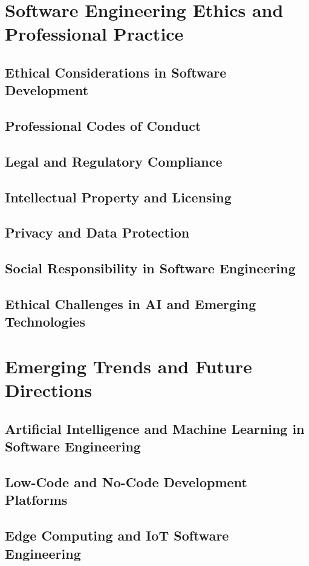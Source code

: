 \newpage

\section{Software Engineering Ethics and Professional Practice}
\subsection{Ethical Considerations in Software Development}
\subsection{Professional Codes of Conduct}
\subsection{Legal and Regulatory Compliance}
\subsection{Intellectual Property and Licensing}
\subsection{Privacy and Data Protection}
\subsection{Social Responsibility in Software Engineering}
\subsection{Ethical Challenges in AI and Emerging Technologies}

\newpage

\section{Emerging Trends and Future Directions}
\subsection{Artificial Intelligence and Machine Learning in Software Engineering}
\subsection{Low-Code and No-Code Development Platforms}
\subsection{Edge Computing and IoT Software Engineering}
